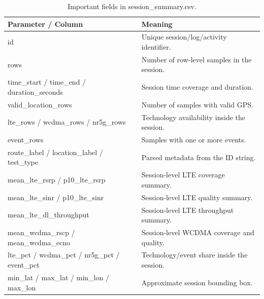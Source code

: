 \documentclass[12pt,a4paper]{article}
\begin{document}
\begin{table}[H]
\centering
\begin{tabularx}{\textwidth}{P{0.38\textwidth}Y}
\toprule
\textbf{Parameter / Column} & \textbf{Meaning} \\
\midrule
{\ttfamily id} & Unique session/log/activity identifier. \\
{\ttfamily rows} & Number of row-level samples in the session. \\
{\ttfamily time\_\allowbreak{}start /\allowbreak{} time\_\allowbreak{}end /\allowbreak{} duration\_\allowbreak{}seconds} & Session time coverage and duration. \\
{\ttfamily valid\_\allowbreak{}location\_\allowbreak{}rows} & Number of samples with valid GPS. \\
{\ttfamily lte\_\allowbreak{}rows /\allowbreak{} wcdma\_\allowbreak{}rows /\allowbreak{} nr5g\_\allowbreak{}rows} & Technology availability inside the session. \\
{\ttfamily event\_\allowbreak{}rows} & Samples with one or more events. \\
{\ttfamily route\_\allowbreak{}label /\allowbreak{} location\_\allowbreak{}label /\allowbreak{} test\_\allowbreak{}type} & Parsed metadata from the ID string. \\
{\ttfamily mean\_\allowbreak{}lte\_\allowbreak{}rsrp /\allowbreak{} p10\_\allowbreak{}lte\_\allowbreak{}rsrp} & Session-level LTE coverage summary. \\
{\ttfamily mean\_\allowbreak{}lte\_\allowbreak{}sinr /\allowbreak{} p10\_\allowbreak{}lte\_\allowbreak{}sinr} & Session-level LTE quality summary. \\
{\ttfamily mean\_\allowbreak{}lte\_\allowbreak{}dl\_\allowbreak{}throughput} & Session-level LTE throughput summary. \\
{\ttfamily mean\_\allowbreak{}wcdma\_\allowbreak{}rscp /\allowbreak{} mean\_\allowbreak{}wcdma\_\allowbreak{}ecno} & Session-level WCDMA coverage and quality. \\
{\ttfamily lte\_\allowbreak{}pct /\allowbreak{} wcdma\_\allowbreak{}pct /\allowbreak{} nr5g\_\allowbreak{}pct /\allowbreak{} event\_\allowbreak{}pct} & Technology/event share inside the session. \\
{\ttfamily min\_\allowbreak{}lat /\allowbreak{} max\_\allowbreak{}lat /\allowbreak{} min\_\allowbreak{}lon /\allowbreak{} max\_\allowbreak{}lon} & Approximate session bounding box. \\
\bottomrule
\end{tabularx}
\caption{Important fields in session\_summary.csv.}
\end{table}
\end{document}
